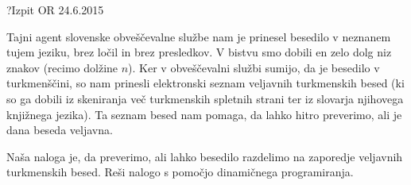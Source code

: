 \begin{naloga}{?}{Izpit OR 24.6.2015}
\begin{vprasanje}
Tajni agent slovenske obveščevalne službe
nam je prinesel besedilo v neznanem tujem jeziku,
brez ločil in brez presledkov.
V bistvu smo dobili en zelo dolg niz znakov (recimo dolžine $n$).
Ker v obveščevalni službi sumijo, da je besedilo v turkmenščini,
so nam prinesli elektronski seznam veljavnih turkmenskih besed
(ki so ga dobili iz skeniranja več turkmenskih spletnih strani
ter iz slovarja njihovega knjižnega jezika).
Ta seznam besed nam pomaga, da lahko hitro preverimo,
ali je dana beseda veljavna.

Naša naloga je, da preverimo,
ali lahko besedilo razdelimo na zaporedje veljavnih turkmenskih besed.
Reši nalogo s pomočjo dinamičnega programiranja.
\end{vprasanje}
\begin{odgovor}
\end{odgovor}
\end{naloga}
